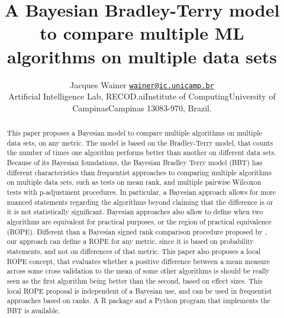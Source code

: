 \documentclass[twoside,11pt,preprint]{article}
\begin{document}
\title{A Bayesian Bradley-Terry model to compare multiple ML algorithms on multiple data sets}

\author{\name Jacques Wainer \email \href{mailto:wainer@ic.unicamp.br}{\nolinkurl{wainer@ic.unicamp.br}}\\
       \addr Artificial Intelligence Lab, RECOD.ai\newline Institute of Computing\newline University of Campinas\newline Campinas 13083-970, Brazil.
       }

\editor{}

\maketitle

\begin{abstract}%
This paper proposes a Bayesian model to compare multiple algorithms on multiple data sets, on any metric. The model is based on the Bradley-Terry model, that counts the number of times one algorithm performs better than another on different data sets. Because of its Bayesian foundations, the Bayesian Bradley Terry model (BBT) has different characteristics than frequentist approaches to comparing multiple algorithms on multiple data sets, such as \citet{demsar} tests on mean rank, and \citet{benavoli2016should} multiple pairwise Wilcoxon tests with p-adjustment procedures. In particular, a Bayesian approach allows for more nuanced statements regarding the algorithms beyond claiming that the difference is or it is not statistically significant. Bayesian approaches also allow to define when two algorithms are equivalent for practical purposes, or the region of practical equivalence (ROPE). Different than a Bayesian signed rank comparison procedure proposed by \citet{benavoli2017time}, our approach can define a ROPE for any metric, since it is based on probability statements, and not on differences of that metric.\newline
This paper also proposes a local ROPE concept, that evaluates whether a positive difference between a mean measure across some cross validation to the mean of some other algorithms is should be really seen as the first algorithm being better than the second, based on effect sizes. This local ROPE proposal is independent of a Bayesian use, and can be used in frequentist approaches based on ranks.\newline
A R package and a Python program that implements the BBT is available.
\end{abstract}
\end{document}
